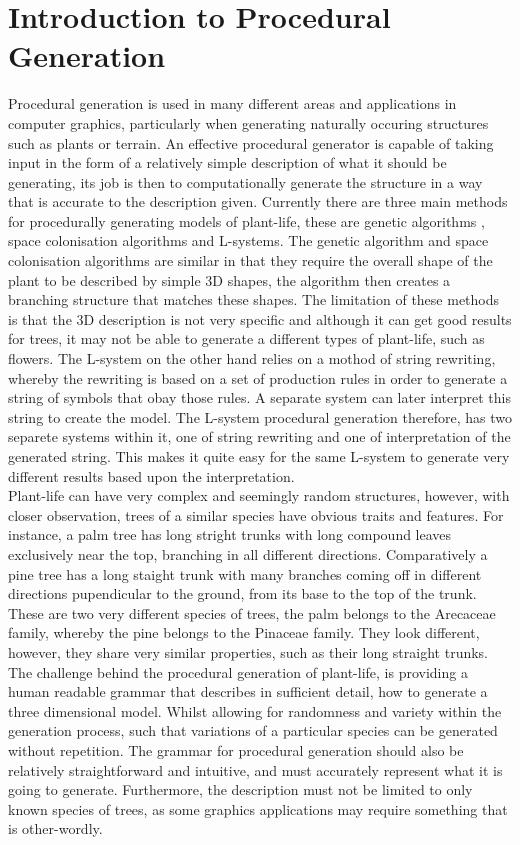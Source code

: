 \section{Introduction to Procedural Generation}

Procedural generation is used in many different areas and applications in computer graphics, particularly when generating naturally occuring structures such as plants or terrain. An effective procedural generator is capable of taking input in the form of a relatively simple description of what it should be generating, its job is then to computationally generate the structure in a way that is accurate to the description given. Currently there are three main methods for procedurally generating models of plant-life, these are genetic algorithms \cite{haubenwallner2017shapegenetics}, space colonisation algorithms\cite{juuso2017procedural} and L-systems. The genetic algorithm and space colonisation algorithms are similar in that they require the overall shape of the plant to be described by simple 3D shapes, the algorithm then creates a branching structure that matches these shapes. The limitation of these methods is that the 3D description is not very specific and although it can get good results for trees, it may not be able to generate a different types of plant-life, such as flowers. The L-system on the other hand relies on a mothod of string rewriting, whereby the rewriting is based on a set of production rules in order to generate a string of symbols that obay those rules. A separate system can later interpret this string to create the model. The L-system procedural generation therefore, has two separete systems within it, one of string rewriting and one of interpretation of the generated string. This makes it quite easy for the same L-system to generate very different results based upon the interpretation.\\

Plant-life can have very complex and seemingly random structures, however, with closer observation, trees of a similar species have obvious traits and features. For instance, a palm tree has long stright trunks with long compound leaves exclusively near the top, branching in all different directions. Comparatively a pine tree has a long staight trunk with many branches coming off in different directions pupendicular to the ground, from its base to the top of the trunk. These are two very different species of trees, the palm  belongs to the Arecaceae family, whereby the pine belongs to the Pinaceae family. They look different, however, they share very similar properties, such as their long straight trunks. The challenge behind the  procedural generation of plant-life, is providing a human readable grammar that describes in sufficient detail, how to generate a three dimensional model. Whilst allowing for randomness and variety within the generation process, such that variations of a particular species can be generated without repetition. The  grammar for procedural generation should also be relatively straightforward and intuitive, and must accurately represent what it is going to generate. Furthermore, the description must not be limited to only known species of trees, as some graphics applications may require something that is other-wordly.

